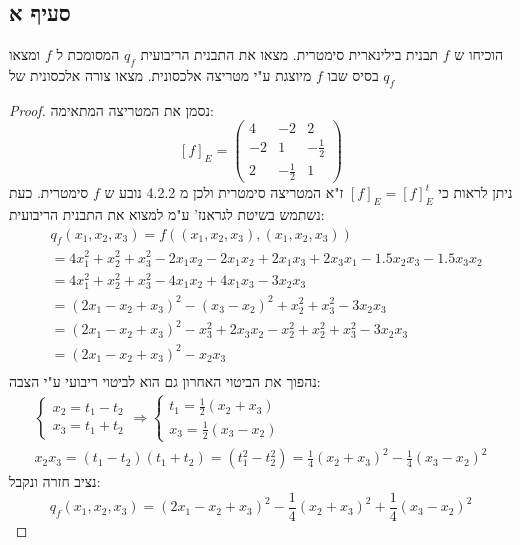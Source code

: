 \documentclass{article}
\begin{document}
    \subsection*{סעיף א}
    הוכיחו ש $f$ תבנית בילינארית סימטרית. מצאו את התבנית הריבועית $q_f$ המסומכת ל $f$ ומצאו בסיס שבו $f$ מיוצגת ע"י מטריצה אלכסונית.
    מצאו צורה אלכסונית של $q_f$
    \begin{proof}
    נסמן את המטריצה המתאימה:
    \[
    [f]_E = \begin{pmatrix}
    4 & -2 & 2 \\
    -2 & 1 & -\frac{1}{2} \\
    2 & -\frac{1}{2} & 1
    \end{pmatrix}
    \]
    ניתן לראות כי $[f]_E = [f]_E^t$ ז"א המטריצה סימטרית ולכן מ 4.2.2 נובע ש $f$ סימטרית.
    כעת נשתמש בשיטת לגראנז' ע"מ למצוא את התבנית הריבועית:
    \begin{align*}
        &q_f(x_1, x_2, x_3) = f((x_1,x_2,x_3), (x_1,x_2,x_3)) \\
        &= 4x_1^2 + x_2^2 + x_3^2 -2x_1x_2 - 2x_1x_2 + 2x_1x_3 + 2x_3x_1 - 1.5x_2x_3 - 1.5x_3x_2 \\
        &= 4x_1^2 + x_2^2 + x_3^2 - 4x_1x_2 + 4x_1x_3 - 3x_2x_3 \\
        &= (2x_1 - x_2 + x_3)^2 - (x_3 - x_2)^2 + x_2^2 + x_3^2 - 3x_2x_3 \\
        &= (2x_1 - x_2 + x_3)^2 -x_3^2 + 2x_3x_2 -x_2^2 + x_2^2 + x_3^2 - 3x_2x_3 \\
        &= (2x_1 - x_2 + x_3)^2 - x_2x_3 \\
    \end{align*}
    נהפוך את הביטוי האחרון גם הוא לביטוי ריבועי ע"י הצבה:
    \begin{align*}
        \begin{cases}
            x_2 = t_1 - t_2 \\
            x_3 = t_1 + t_2
        \end{cases}
        \Rightarrow
        \begin{cases}
            t_1 = \frac{1}{2}(x_2 + x_3) \\
            x_3 = \frac{1}{2}(x_3 - x_2)
        \end{cases} \\
        x_2x_3 = (t_1 - t_2)(t_1 + t_2) = (t_1^2 - t_2^2) = \frac{1}{4}(x_2 + x_3)^2 - \frac{1}{4}(x_3 - x_2)^2
    \end{align*}
    נציב חזרה ונקבל:
    \[ q_f(x_1, x_2, x_3) = (2x_1 - x_2 + x_3)^2 - \frac{1}{4}(x_2 + x_3)^2 + \frac{1}{4}(x_3 - x_2)^2 \]

\end{proof}
\end{document}
